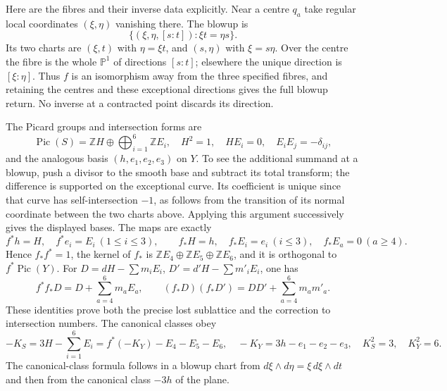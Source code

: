 Here are the fibres and their inverse data explicitly. Near a centre $q_a$
take regular local coordinates $(\xi,\eta)$ vanishing there. The blowup is
\[
 \{(\xi,\eta,[s:t]):\xi t=\eta s\}.
\]
Its two charts are $(\xi,t)$ with $\eta=\xi t$, and $(s,\eta)$ with
$\xi=s\eta$. Over the centre the fibre is the whole $\mathbb P^1$ of
directions $[s:t]$; elsewhere the unique direction is $[\xi:\eta]$.
Thus $f$ is an isomorphism away from the three specified fibres, and
retaining the centres and these exceptional directions gives the full
blowup return. No inverse at a contracted point discards its direction.

The Picard groups and intersection forms are
\[
\operatorname{Pic}(S)=\mathbb ZH\oplus\bigoplus_{i=1}^6\mathbb ZE_i,
\quad H^2=1,\quad H E_i=0,\quad E_iE_j=-\delta_{ij},
\]
and the analogous basis $(h,e_1,e_2,e_3)$ on $Y$. To see the additional
summand at a blowup, push a divisor to the smooth base and subtract its
total transform; the difference is supported on the exceptional curve.
Its coefficient is unique since that curve has self-intersection $-1$,
as follows from the transition of its normal coordinate between the two
charts above. Applying this argument successively gives the displayed bases.
The maps are exactly
\[
 f^*h=H,\quad f^*e_i=E_i\ (1\le i\le3),\qquad
 f_*H=h,\quad f_*E_i=e_i\ (i\le3),\quad f_*E_a=0\ (a\ge4).
                                                               \tag{PH3}
\]
Hence $f_*f^*=1$, the kernel of $f_*$ is
$\mathbb ZE_4\oplus\mathbb ZE_5\oplus\mathbb ZE_6$, and it is orthogonal
to $f^*\operatorname{Pic}(Y)$. For
$D=dH-\sum m_iE_i$, $D'=d'H-\sum m'_iE_i$, one has
\[
 f^*f_*D=D+\sum_{a=4}^6m_aE_a,\qquad
 (f_*D)(f_*D')=DD'+\sum_{a=4}^6m_am'_a.                         \tag{PH4}
\]
These identities prove both the precise lost sublattice and the correction
to intersection numbers. The canonical classes obey
\[
 -K_S=3H-\sum_{i=1}^6E_i=f^*(-K_Y)-E_4-E_5-E_6,
 \quad -K_Y=3h-e_1-e_2-e_3,
 \quad K_S^2=3,\quad K_Y^2=6.                                  \tag{PH5}
\]
The canonical-class formula follows in a blowup chart from
$d\xi\wedge d\eta=\xi\,d\xi\wedge dt$ and then from the canonical
class $-3h$ of the plane.


